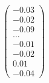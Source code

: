 \documentclass[preview]{standalone}
\begin{document}
\begin{align*}
\begin{pmatrix} -0.03 \\ -0.02 \\ -0.09 \\ \dots \\ -0.01 \\ -0.02 \\ 0.01 \\ -0.04 \end{pmatrix}
\end{align*}
\end{document}
